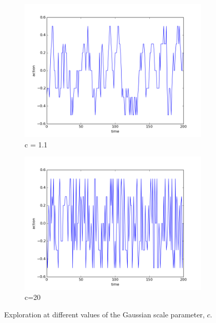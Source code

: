 \documentclass[a4paper,11pt]{report}
\begin{document}
\begin{figure}[t]
	\centering
      \begin{subfigure}[b]{0.45\columnwidth}

    \includegraphics[clip=true,width=1.\textwidth]{figures/action_11.png}
    \caption{c = 1.1}
    \label{fig:c_11}
  \end{subfigure}
  \begin{subfigure}[b]{0.45\columnwidth}
    \includegraphics[clip=true,width=1.\textwidth]{figures/action_c20.png}
    \caption{c=20}
    \label{fig:c_20}
  \end{subfigure} 

  \caption[Exploration at different parameters]{Exploration at different values of the Gaussian scale parameter, $c$.}
  \label{fig:exploration}
\end{figure}
\end{document}
